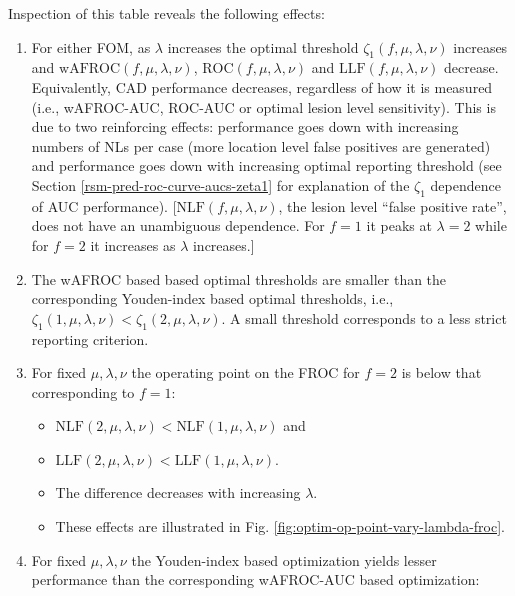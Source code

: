 \documentclass[
]{book}
\providecommand{\tightlist}{%
  \setlength{\itemsep}{0pt}\setlength{\parskip}{0pt}}
\begin{document}
Inspection of this table reveals the following effects:

\begin{enumerate}
\def\labelenumi{\arabic{enumi}.}
\item
  For either FOM, as \(\lambda\) increases the optimal threshold \(\zeta_{1} \left ( f, \mu, \lambda, \nu \right )\) increases and \(\text{wAFROC} \left ( f, \mu, \lambda, \nu \right )\), \(\text{ROC} \left ( f, \mu, \lambda, \nu \right )\) and \(\text{LLF} \left ( f, \mu, \lambda, \nu \right )\) decrease. Equivalently, CAD performance decreases, regardless of how it is measured (i.e., wAFROC-AUC, ROC-AUC or optimal lesion level sensitivity). This is due to two reinforcing effects: performance goes down with increasing numbers of NLs per case (more location level false positives are generated) and performance goes down with increasing optimal reporting threshold (see Section \ref{rsm-pred-roc-curve-aucs-zeta1} for explanation of the \(\zeta_1\) dependence of AUC performance). {[}\(\text{NLF} \left ( f, \mu, \lambda, \nu \right )\), the lesion level ``false positive rate'', does not have an unambiguous dependence. For \(f = 1\) it peaks at \(\lambda = 2\) while for \(f = 2\) it increases as \(\lambda\) increases.{]}
\item
  The wAFROC based based optimal thresholds are smaller than the corresponding Youden-index based optimal thresholds, i.e., \(\zeta_{1} \left ( 1, \mu, \lambda, \nu \right ) < \zeta_{1} \left ( 2, \mu, \lambda, \nu \right )\). A small threshold corresponds to a less strict reporting criterion.
\item
  For fixed \(\mu, \lambda, \nu\) the operating point on the FROC for \(f = 2\) is below that corresponding to \(f = 1\):

  \begin{itemize}
  \tightlist
  \item
    \(\text{NLF} \left (2, \mu, \lambda, \nu \right ) < \text{NLF} \left (1, \mu, \lambda, \nu \right )\) and
  \item
    \(\text{LLF} \left (2, \mu, \lambda, \nu \right ) < \text{LLF} \left (1, \mu, \lambda, \nu \right )\).
  \item
    The difference decreases with increasing \(\lambda\).
  \item
    These effects are illustrated in Fig. \ref{fig:optim-op-point-vary-lambda-froc}.
  \end{itemize}
\item
  For fixed \(\mu, \lambda, \nu\) the Youden-index based optimization yields lesser performance than the corresponding wAFROC-AUC based optimization:


\end{enumerate}
\end{document}
